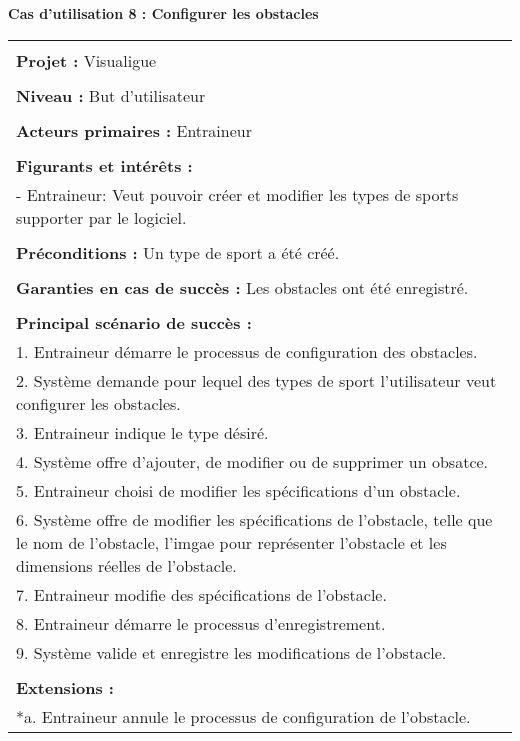 \newpage
\begin{flushleft}
	\textbf{Cas d'utilisation 8 : Configurer les obstacles}\\
\end{flushleft}
\begin{tabular}{|p{16cm}|}
	\hline
	\\
	\textbf{Projet :} Visualigue\\
	\\
	\textbf{Niveau :} But d'utilisateur\\
	\\
	\textbf{Acteurs primaires :} Entraineur\\
	\\
	\textbf{Figurants et intérêts :} \\
	- Entraineur: Veut pouvoir créer et modifier les types de sports supporter par le logiciel.\\
	\\
	\textbf{Préconditions :} Un type de sport a été créé.\\
	\\
	\textbf{Garanties en cas de succès :} Les obstacles ont été enregistré.\\
	\\
	\textbf{Principal scénario de succès :}\\
	1. Entraineur démarre le processus de configuration des obstacles.\\
	2. Système demande pour lequel des types de sport l'utilisateur veut configurer les obstacles.\\
	3. Entraineur indique le type désiré.\\
	4. Système offre d'ajouter, de modifier ou de supprimer un obsatce.\\
	5. Entraineur choisi de modifier les spécifications d'un obstacle.\\
	6. Système offre de modifier les spécifications de l'obstacle, telle que le nom de l'obstacle, l'imgae pour représenter l'obstacle et les dimensions réelles de l'obstacle.\\
	7. Entraineur modifie des spécifications de l'obstacle.\\
	8. Entraineur démarre le processus d'enregistrement.\\
	9. Système valide et enregistre les modifications de l'obstacle.\\
	\\
	\textbf{Extensions :}\\
	*a. Entraineur annule le processus de configuration de l'obstacle.\\

\end{tabular}
